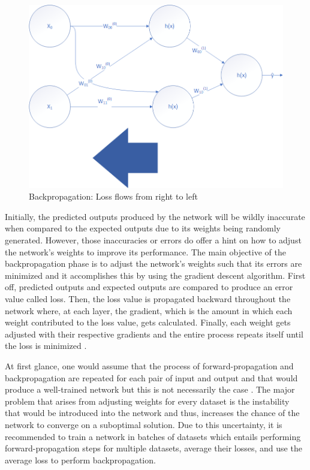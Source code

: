 \documentclass[conference]{IEEEtran}
\begin{document}
        \begin{figure}[!htb]
            \centering
            \captionsetup{justification=centering}
            \includegraphics[width=\linewidth]{BackwardProp.png}
            \caption{Backpropagation: Loss flows from right to left}  
        \end{figure}

        Initially, the predicted outputs produced by the network will be wildly inaccurate when compared to the expected outputs due to its weights being randomly generated. However, those inaccuracies or errors do offer a hint on how to adjust the network’s weights to improve its performance. The main objective of the backpropagation phase is to adjust the network’s weights such that its errors are minimized and it accomplishes this by using the gradient descent algorithm. First off, predicted outputs and expected outputs are compared to produce an error value called loss. Then, the loss value is propagated backward throughout the network where, at each layer, the gradient, which is the amount in which each weight contributed to the loss value, gets calculated. Finally, each weight gets adjusted with their respective gradients and the entire process repeats itself until the loss is minimized \cite{kostadinov_2019}.

        At first glance, one would assume that the process of forward-propagation and backpropagation are repeated for each pair of input and output and that would produce a well-trained network but this is not necessarily the case \cite{ruder2017overview}. The major problem that arises from adjusting weights for every dataset is the instability that would be introduced into the network and thus, increases the chance of the network to converge on a suboptimal solution. Due to this uncertainty, it is recommended to train a network in batches of datasets which entails performing forward-propagation steps for multiple datasets, average their losses, and use the average loss to perform backpropagation. 
\end{document}
